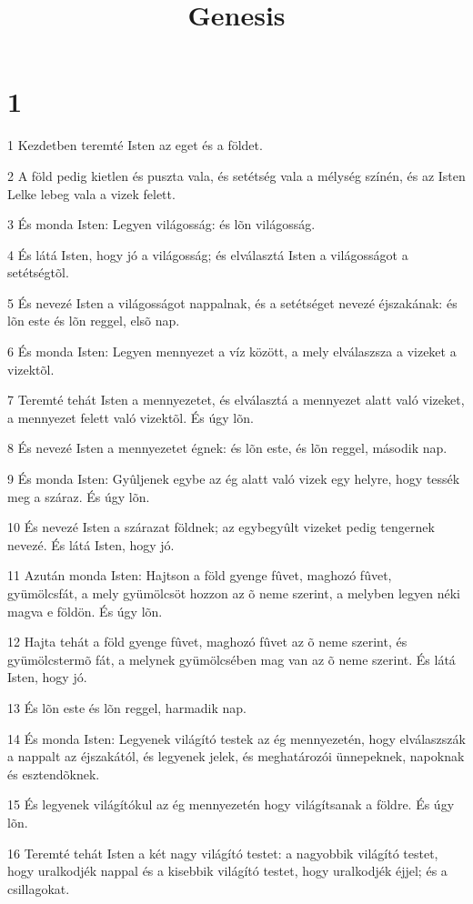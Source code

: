 

\title{Genesis}


\chapter{1}

\par 1 Kezdetben teremté Isten az eget és a földet.
\par 2 A föld pedig kietlen és puszta vala, és setétség vala a mélység színén, és az Isten Lelke lebeg vala a vizek felett.
\par 3 És monda Isten: Legyen világosság: és lõn világosság.
\par 4 És látá Isten, hogy jó a világosság; és elválasztá Isten a világosságot a setétségtõl.
\par 5 És nevezé Isten a világosságot nappalnak, és a setétséget nevezé éjszakának: és lõn este és lõn reggel, elsõ nap.
\par 6 És monda Isten: Legyen mennyezet a víz között, a mely elválaszsza a vizeket a vizektõl.
\par 7 Teremté tehát Isten a mennyezetet, és elválasztá a mennyezet alatt való vizeket, a mennyezet felett való vizektõl. És úgy lõn.
\par 8 És nevezé Isten a mennyezetet égnek: és lõn este, és lõn reggel, második nap.
\par 9 És monda Isten: Gyûljenek egybe az ég alatt való vizek egy helyre, hogy tessék meg a száraz. És úgy lõn.
\par 10 És nevezé Isten a szárazat földnek; az egybegyûlt vizeket pedig tengernek nevezé. És látá Isten, hogy jó.
\par 11 Azután monda Isten: Hajtson a föld gyenge fûvet, maghozó fûvet, gyümölcsfát, a mely gyümölcsöt hozzon az õ neme szerint, a melyben legyen néki magva e földön. És úgy lõn.
\par 12 Hajta tehát a föld gyenge fûvet, maghozó fûvet az õ neme szerint, és gyümölcstermõ fát, a melynek gyümölcsében mag van az õ neme szerint. És látá Isten, hogy jó.
\par 13 És lõn este és lõn reggel, harmadik nap.
\par 14 És monda Isten: Legyenek világító testek az ég mennyezetén, hogy elválaszszák a nappalt az éjszakától, és legyenek jelek, és meghatározói ünnepeknek, napoknak és esztendõknek.
\par 15 És legyenek világítókul az ég mennyezetén hogy világítsanak a földre. És úgy lõn.
\par 16 Teremté tehát Isten a két nagy világító testet: a nagyobbik világító testet, hogy uralkodjék nappal és a kisebbik világító testet, hogy uralkodjék éjjel; és a csillagokat.
